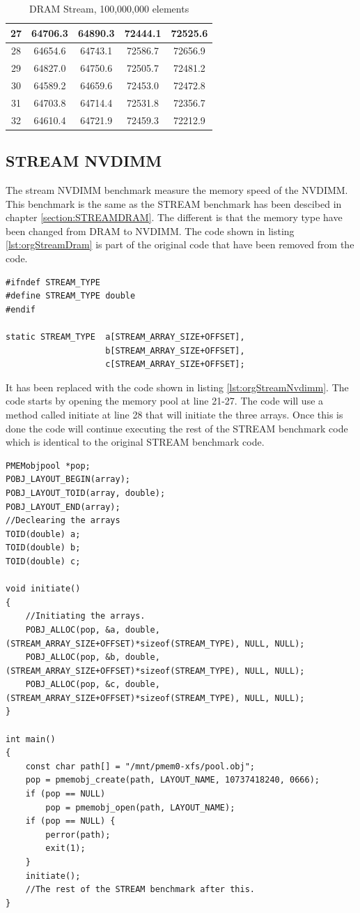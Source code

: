 \documentclass[12pt,a4paper,USenglish]{article}      %
\begin{document}
\begin{table}[!hbtp]
\begin{tabular}{ |c|c|c|c|c| }
\hline
27 & 64706.3 & 64890.3 & 72444.1 & 72525.6 \\
\hline
28 & 64654.6 & 64743.1 & 72586.7 & 72656.9 \\
\hline
29 & 64827.0 & 64750.6 & 72505.7 & 72481.2 \\
\hline
30 & 64589.2 & 64659.6 & 72453.0 & 72472.8 \\
\hline
31 & 64703.8 & 64714.4 & 72531.8 & 72356.7 \\
\hline
32 & 64610.4 & 64721.9 & 72459.3 & 72212.9 \\
\hline
\end{tabular}
\caption{DRAM Stream, 100,000,000 elements}
\label{tab:DRAM_STREAM_100M_Table}
\end{table}

\subsection{STREAM NVDIMM}
\label{section:STREAM_NVDIMM}
The stream NVDIMM benchmark measure the memory speed of the NVDIMM. This benchmark is the same as the STREAM benchmark has been descibed in chapter \ref{section:STREAMDRAM}. The different is that the memory type have been changed from DRAM to NVDIMM.
The code shown in listing \ref{lst:orgStreamDram} is part of the original code that have been removed from the code.
\begin{lstlisting}[caption={Original STREAM benchmark code at line 175-181.}, label={lst:orgStreamDram}]
#ifndef STREAM_TYPE
#define STREAM_TYPE double
#endif

static STREAM_TYPE  a[STREAM_ARRAY_SIZE+OFFSET],
                    b[STREAM_ARRAY_SIZE+OFFSET],
                    c[STREAM_ARRAY_SIZE+OFFSET];
\end{lstlisting}
It has been replaced with the code shown in listing \ref{lst:orgStreamNvdimm}. The code starts by opening the memory pool at line 21-27. The code will use a method called initiate at line 28 that will initiate the three arrays. Once this is done the code will continue executing the rest of the STREAM benchmark code which is identical to the original STREAM benchmark code.
\begin{lstlisting}[caption={Code that has replaced original code.}, label={lst:orgStreamNvdimm}]
PMEMobjpool *pop;
POBJ_LAYOUT_BEGIN(array);
POBJ_LAYOUT_TOID(array, double);
POBJ_LAYOUT_END(array);
//Declearing the arrays
TOID(double) a;
TOID(double) b;
TOID(double) c;

void initiate()
{
	//Initiating the arrays.
	POBJ_ALLOC(pop, &a, double, (STREAM_ARRAY_SIZE+OFFSET)*sizeof(STREAM_TYPE), NULL, NULL);
	POBJ_ALLOC(pop, &b, double, (STREAM_ARRAY_SIZE+OFFSET)*sizeof(STREAM_TYPE), NULL, NULL);
	POBJ_ALLOC(pop, &c, double, (STREAM_ARRAY_SIZE+OFFSET)*sizeof(STREAM_TYPE), NULL, NULL);
}

int main()
{
	const char path[] = "/mnt/pmem0-xfs/pool.obj";
	pop = pmemobj_create(path, LAYOUT_NAME, 10737418240, 0666);
	if (pop == NULL)
		pop = pmemobj_open(path, LAYOUT_NAME);
	if (pop == NULL) {
		perror(path);
		exit(1);
	}
	initiate();
	//The rest of the STREAM benchmark after this.
}
\end{lstlisting}
\end{document}
